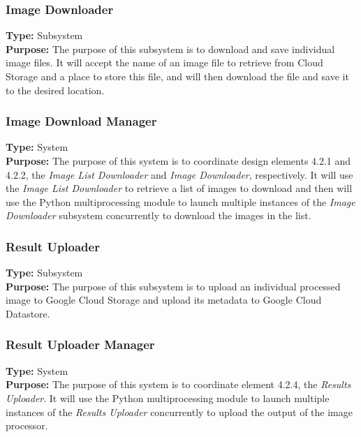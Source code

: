 \documentclass[10pt, onecolumn, draftclsnofoot, letterpaper, compsoc]{IEEEtran}
\begin{document}
    \subsubsection{Image Downloader}
    \textbf{Type:} Subsystem \\
    \textbf{Purpose:} The purpose of this subsystem is to download and save individual image files. It will
    accept the name of an image file to retrieve from Cloud Storage and a place to store this file, and will
    then download the file and save it to the desired location. \\

    \subsubsection{Image Download Manager}
    \textbf{Type:} System \\
    \textbf{Purpose:} The purpose of this system is to coordinate design elements 4.2.1 and 4.2.2, the
    \textit{Image List Downloader} and \textit{Image Downloader}, respectively. It will use the
    \textit{Image List Downloader} to retrieve a list of images to download and then will use the Python
    multiprocessing module to launch multiple instances of the \textit{Image Downloader} subsystem
    concurrently to download the images in the list. \\

    \subsubsection{Result Uploader}
    \textbf{Type:} Subsystem \\
    \textbf{Purpose:} The purpose of this subsystem is to upload an individual processed image to Google Cloud
    Storage and upload its metadata to Google Cloud Datastore. \\

    \subsubsection{Result Uploader Manager}
    \textbf{Type:} System \\
    \textbf{Purpose:} The purpose of this system is to coordinate element 4.2.4, the \textit{Results Uploader}.
    It will use the Python multiprocessing module to launch multiple instances of the \textit{Results Uploader}
    concurrently to upload the output of the image processor. \\
\end{document}
